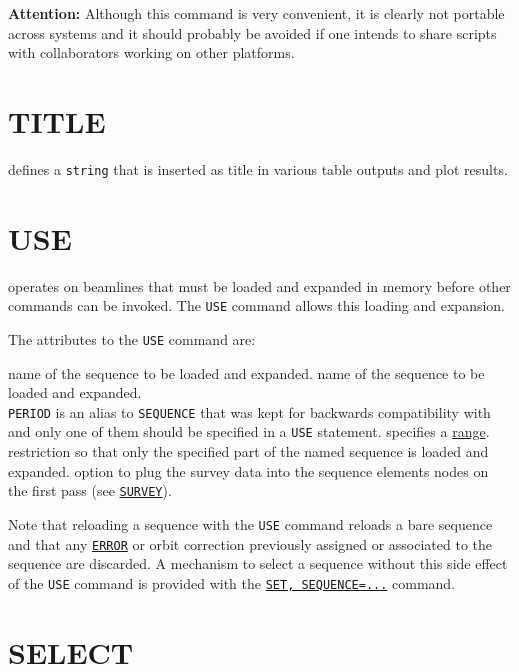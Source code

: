 \textbf{Attention:} Although this command is very convenient, it is
clearly not portable across systems and it should probably be avoided if
one intends to share \madx scripts with collaborators working on other
platforms.  

\section{TITLE}
\label{sec:title}
defines a \texttt{string} that is inserted as title in various table
outputs and plot results.  


\section{USE}
\label{sec:use}
\madx operates on beamlines that must be loaded and expanded in memory
before other commands can be invoked. The \texttt{USE} command allows
this loading and expansion.


The attributes to the \texttt{USE} command are:
\begin{madlist}
   name of the sequence to be loaded and expanded. 
   name of the sequence to be loaded and expanded. \\ 
  \texttt{PERIOD} is an alias to \texttt{SEQUENCE} that was kept for
  backwards compatibility with \madeight and only one of them should be
  specified in a \texttt{USE} statement. 
   specifies a \hyperref[sec:range]{range}.   
  restriction so that only the specified part of the named sequence is
  loaded and  expanded.
   option to plug the survey data into the sequence elements
  nodes on the first pass (see \hyperref[chap:survey]{\texttt{SURVEY}}).
\end{madlist}

Note that reloading a sequence with the \texttt{USE} command reloads a
bare sequence and that any \hyperref[chap:error]{\texttt{ERROR}} or
orbit correction previously assigned or associated to the sequence are
discarded. A mechanism to select a sequence without this side effect of the 
\texttt{USE} command is provided with the
\hyperref[sec:set]{\texttt{SET, SEQUENCE=...}} command. 


\section{SELECT} 
\label{sec:select}

